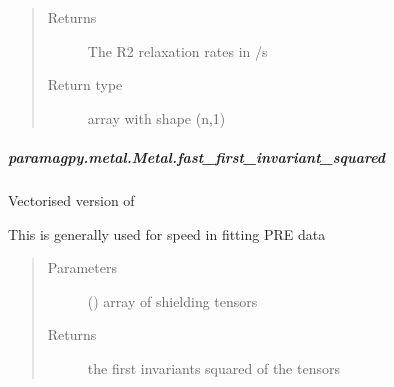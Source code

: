 \documentclass[a4paper,10pt,english,openany,oneside]{sphinxmanual}
\begin{document}
\begin{fulllineitems}
\begin{fulllineitems}
\begin{fulllineitems}
\begin{quote}
\begin{description}
\begin{itemize}
\end{itemize}

\item[{Returns}] \leavevmode
{} \textendash{} The R2 relaxation rates in /s

\item[{Return type}] \leavevmode
array with shape (n,1)

\end{description}\end{quote}

\end{fulllineitems}



\subparagraph{paramagpy.metal.Metal.fast\_first\_invariant\_squared}
\label{\detokenize{reference/generated/paramagpy.metal.Metal.fast_first_invariant_squared:paramagpy-metal-metal-fast-first-invariant-squared}}\label{\detokenize{reference/generated/paramagpy.metal.Metal.fast_first_invariant_squared::doc}}

\begin{fulllineitems}
\label{\detokenize{reference/generated/paramagpy.metal.Metal.fast_first_invariant_squared:paramagpy.metal.Metal.fast_first_invariant_squared}}
Vectorised version of
{\hyperref[\detokenize{reference/generated/paramagpy.metal.Metal.first_invariant_squared:paramagpy.metal.Metal.first_invariant_squared}]{}}

This is generally used for speed in fitting PRE data
\begin{quote}\begin{description}
\item[{Parameters}] \leavevmode
{} (\sphinxstyleliteralemphasis{\sphinxupquote{ (}}\sphinxstyleliteralemphasis{\sphinxupquote{,}}\sphinxstyleliteralemphasis{\sphinxupquote{,}}\sphinxstyleliteralemphasis{\sphinxupquote{)}}) \textendash{} array of shielding tensors

\item[{Returns}] \leavevmode
{} \textendash{} the first invariants squared of the tensors


\end{description}
\end{quote}
\end{fulllineitems}
\end{fulllineitems}
\end{fulllineitems}
\end{document}
